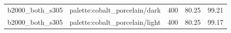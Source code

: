 \begin{longtable}{l>{\raggedright\arraybackslash}p{.42\linewidth}rrr}
b2000\_\allowbreak{}both\_\allowbreak{}s305 & %
palette:cobalt\_\allowbreak{}porcelain/dark & %
400 & %
80.25 & %
99.21 \\ %

b2000\_\allowbreak{}both\_\allowbreak{}s305 & %
palette:cobalt\_\allowbreak{}porcelain/light & %
400 & %
80.25 & %
99.17 \\ %


\end{longtable}
